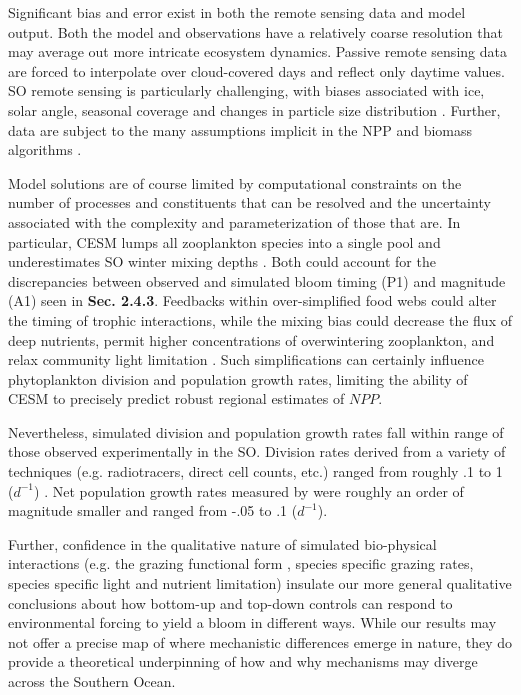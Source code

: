 Significant bias and error exist in both the remote sensing data and model output. Both the model and observations have a relatively coarse resolution that may average out more intricate ecosystem dynamics. Passive remote sensing data are forced to interpolate over cloud-covered days and reflect only daytime values. SO remote sensing is particularly challenging, with biases associated with ice, solar angle, seasonal coverage and changes in particle size distribution \parencite{DierssenBioopticalpropertiesremote2000}. Further, data are subject to the many assumptions implicit in the NPP and biomass algorithms \parencite{BehrenfeldCarbonbasedoceanproductivity2005, WestberryCarbonbasedprimaryproductivity2008, BehrenfeldAnnualcyclesecological2013}. 

Model solutions are of course limited by computational constraints on the number of processes and constituents that can be resolved and the uncertainty associated with the complexity and parameterization of those that are. In particular, CESM lumps all zooplankton species into a single pool and underestimates SO winter mixing depths \parencite{MooreMarineEcosystemDynamics2013}. Both could account for the discrepancies between observed and simulated bloom timing (P1) and magnitude (A1) seen in \textbf{Sec. 2.4.3}. Feedbacks within over-simplified food webs could alter the timing of trophic interactions, while the mixing bias could decrease the flux of deep nutrients, permit higher concentrations of overwintering zooplankton, and relax community light limitation \parencite{DoneySkillmetricsconfronting2009g}. Such simplifications can certainly influence phytoplankton division and population growth rates, limiting the ability of CESM to precisely predict robust regional estimates of $NPP$.

Nevertheless, simulated division and population growth rates fall within range of those observed experimentally in the SO. Division rates derived from a variety of techniques (e.g. radiotracers, direct cell counts, etc.) ranged from roughly .1 to 1 ($d^{-1}$) \parencite{SakshaugPhotoadaptationAntarcticphytopfankton1986,SpiesGrowthratesAntarctic1987,SmithPhytoplanktongrowthrates1999}. Net population growth rates measured by \textcite{BoydControlphytoplanktongrowth2001} were roughly an order of magnitude smaller and ranged from -.05 to .1 ($d^{-1}$).

Further, confidence in the qualitative nature of simulated bio-physical interactions (e.g. the grazing functional form \parencite{Fashamnitrogenbasedmodelplankton1990, Doneynewcoupledonedimensional1996}, species specific grazing rates, species specific light \parencite{Geiderdynamicregulatorymodel1998} and nutrient \parencite{vanderPloegOriginTheoryMineral1999} limitation) insulate our more general qualitative conclusions about how bottom-up and top-down controls can respond to environmental forcing to yield a bloom in different ways. While our results may not offer a precise map of where mechanistic differences emerge in nature, they do provide a theoretical underpinning of how and why mechanisms may diverge across the Southern Ocean.

